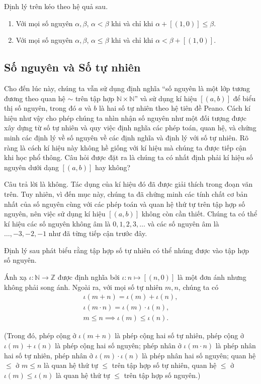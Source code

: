 Định lý trên kéo theo hệ quả sau.
\begin{corollary}
    \begin{enumerate}
        \item Với mọi số nguyên $\alpha, \beta$, $\alpha < \beta$ khi và chỉ khi $\alpha + [(1, 0)]\leq \beta$.
        \item Với mọi số nguyên $\alpha, \beta$, $\alpha\leq \beta$ khi và chỉ khi $\alpha < \beta + [(1,0)]$.
    \end{enumerate}
\end{corollary}

\subsection{Số nguyên và Số tự nhiên}

Cho đến lúc này, chúng ta vẫn sử dụng định nghĩa ``số nguyên là một lớp tương đương theo quan hệ $\sim$ trên tập hợp $\mathbb{N}\times\mathbb{N}$'' và sử dụng kí hiệu $[(a, b)]$ để biểu thị số nguyên, trong đó $a$ và $b$ là hai số tự nhiên theo hệ tiên đề Peano. Cách kí hiệu như vậy cho phép chúng ta nhìn nhận số nguyên như một đối tượng được xây dựng từ số tự nhiên và quy việc định nghĩa các phép toán, quan hệ, và chứng minh các định lý về số nguyên về các định nghĩa và định lý với số tự nhiên. Rõ ràng là cách kí hiệu này không hề giống với kí hiệu mà chúng ta được tiếp cận khi học phổ thông. Câu hỏi được đặt ra là chúng ta có nhất định phải kí hiệu số nguyên dưới dạng $[(a, b)]$ hay không?

Câu trả lời là không. Tác dụng của kí hiệu đó đã được giải thích trong đoạn văn trên. Tuy nhiên, vì đến mục này, chúng ta đã chứng minh các tính chất cơ bản nhất của số nguyên cùng với các phép toán và quan hệ thứ tự trên tập hợp số nguyên, nên việc sử dụng kí hiệu $[(a, b)]$ không còn cần thiết. Chúng ta có thể kí hiệu các số nguyên không âm là $0, 1, 2, 3,\ldots$ và các số nguyên âm là $\ldots, -3, -2, -1$ như đã từng tiếp cận trước đây.

Định lý sau phát biểu rằng tập hợp số tự nhiên có thể nhúng được vào tập hợp số nguyên.
\begin{theorem}\label{theorem:embed-N-into-Z}
    Ánh xạ $\iota: \mathbb{N}\to \mathbb{Z}$ được định nghĩa bởi $\iota: n\mapsto [(n, 0)]$ là một đơn ánh nhưng không phải song ánh. Ngoài ra, với mọi số tự nhiên $m, n$, chúng ta có
    \[
        \begin{split}
            \iota(m + n) = \iota(m) + \iota(n), \\
            \iota(m\cdot n) = \iota(m)\cdot\iota(n), \\
            m\leq n \implies \iota(m)\leq \iota(n).
        \end{split}
    \]

    (Trong đó, phép cộng ở $\iota(m + n)$ là phép cộng hai số tự nhiên, phép cộng ở $\iota(m) + \iota(n)$ là phép cộng hai số nguyên; phép nhân ở $\iota(m\cdot n)$ là phép nhân hai số tự nhiên, phép nhân ở $\iota(m)\cdot\iota(n)$ là phép nhân hai số nguyên; quan hệ $\leq$ ở $m\leq n$ là quan hệ thứ tự $\leq$ trên tập hợp số tự nhiên, quan hệ $\leq$ ở $\iota(m)\leq \iota(n)$ là quan hệ thứ tự $\leq$ trên tập hợp số nguyên.)
\end{theorem}

